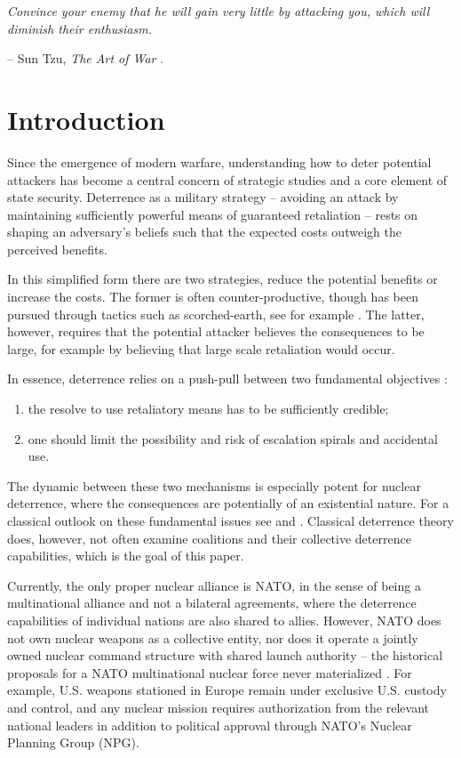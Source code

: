 
\vspace*{2em}
\emph{Convince your enemy that he will gain very little by attacking you, which will diminish their enthusiasm.}
\begin{flushright}
    -- Sun Tzu, \emph{The Art of War} \parencite{Art_of_war}.
\end{flushright}

\section{Introduction}
Since the emergence of modern warfare, understanding how to deter potential attackers has become a central concern of strategic studies and a core element of state security. Deterrence as a military strategy -- avoiding an attack by maintaining sufficiently powerful means of guaranteed retaliation \parencite{Schelling_1966,Snyder_1961} -- rests on shaping an adversary's beliefs such that the expected costs outweigh the perceived benefits.

In this simplified form there are two strategies, reduce the potential benefits or increase the costs. The former is often counter-productive, though has been pursued through tactics such as scorched-earth, see for example \parencite{Kreike_2021}. The latter, however, requires that the potential attacker believes the consequences to be large, for example by believing that large scale retaliation would occur. 

In essence, deterrence relies on a push-pull between two fundamental objectives \parencite{Schelling_1960}: 
\begin{enumerate}
    \item the resolve to use retaliatory means has to be sufficiently credible; 
    \item one should limit the possibility and risk of escalation spirals and accidental use. 
\end{enumerate} 
The dynamic between these two mechanisms is especially potent for nuclear deterrence, where the consequences are potentially of an existential nature. For a classical outlook on these fundamental issues see \parencite{Schelling_1960} and \parencite{Snyder_1961}. Classical deterrence theory does, however, not often examine coalitions and their collective deterrence capabilities, which is the goal of this paper. 

Currently, the only proper nuclear alliance is NATO, in the sense of being a multinational alliance and not a bilateral agreements, where the deterrence capabilities of individual nations are also shared to allies. However, NATO does not own nuclear weapons as a collective entity, nor does it operate a jointly owned nuclear command structure with shared launch authority -- the historical proposals for a NATO multinational nuclear force never materialized \parencite{Trachtenberg_1999}. For example, U.S. weapons stationed in Europe remain under exclusive U.S. custody and control, and any nuclear mission requires authorization from the relevant national leaders in addition to political approval through NATO's Nuclear Planning Group (NPG). 

